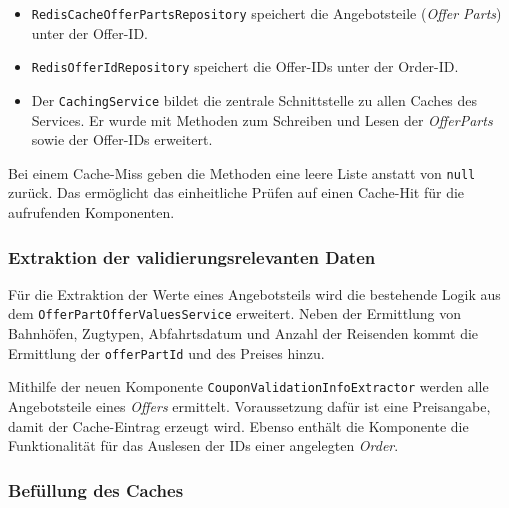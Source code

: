 \begin{itemize}
    \item \texttt{RedisCacheOfferPartsRepository} speichert die Angebotsteile (\textit{Offer Parts}) unter der Offer-ID.
    \item \texttt{RedisOfferIdRepository} speichert die Offer-IDs unter der Order-ID.
    \item Der \texttt{CachingService} bildet die zentrale Schnittstelle zu allen Caches des Services. Er wurde mit Methoden zum Schreiben und Lesen der \textit{OfferParts} sowie der Offer-IDs erweitert.
\end{itemize}

Bei einem Cache-Miss geben die Methoden eine leere Liste anstatt von \texttt{null} zurück. Das ermöglicht das einheitliche Prüfen auf einen Cache-Hit für die aufrufenden Komponenten.


\subsubsection{Extraktion der validierungsrelevanten Daten}
\label{subsubsec:extraktion}

Für die Extraktion der Werte eines Angebotsteils wird die bestehende Logik aus dem \texttt{OfferPartOfferValuesService} erweitert. Neben der Ermittlung von Bahnhöfen, Zugtypen, Abfahrtsdatum und Anzahl der Reisenden kommt die Ermittlung der \texttt{offerPartId} und des Preises hinzu.


Mithilfe der neuen Komponente \texttt{CouponValidationInfoExtractor} werden alle Angebotsteile eines \textit{Offers} ermittelt. Voraussetzung dafür ist eine Preisangabe, damit der Cache-Eintrag erzeugt wird. Ebenso enthält die Komponente die Funktionalität für das Auslesen der IDs einer angelegten \textit{Order}. %

\subsubsection{Befüllung des Caches}
\label{subsubsec:befuellung_umsetzung}


